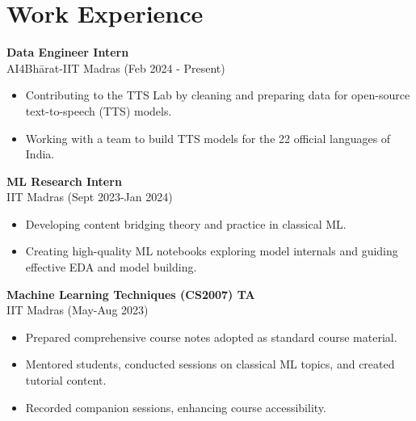 \documentclass[a4paper,10pt]{article}
\begin{document}
\section*{Work Experience}
\textbf{Data Engineer Intern} \\
AI4Bhārat-IIT Madras (Feb 2024 - Present)
\begin{itemize}[noitemsep]
    \item Contributing to the TTS Lab by cleaning and preparing data for open-source text-to-speech (TTS) models.
    \item Working with a team to build TTS models for the 22 official languages of India.
\end{itemize}
\textbf{ML Research Intern} \\
IIT Madras (Sept 2023-Jan 2024)
\begin{itemize}[noitemsep]
    \item Developing content bridging theory and practice in classical ML.
    \item Creating high-quality ML notebooks exploring model internals and guiding effective EDA and model building.
\end{itemize}
\textbf{Machine Learning Techniques (CS2007) TA} \\
IIT Madras (May-Aug 2023)
\begin{itemize}[noitemsep]
    \item Prepared comprehensive course notes adopted as standard course material.
    \item Mentored students, conducted sessions on classical ML topics, and created tutorial content.
    \item Recorded companion sessions, enhancing course accessibility.
\end{itemize}

\newpage
\end{document}
